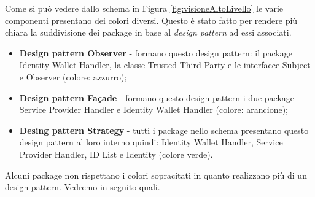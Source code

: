 Come si può vedere dallo schema in Figura \ref{fig:visioneAltoLivello} le varie componenti presentano dei colori diversi. Questo è stato fatto per rendere più chiara la suddivisione dei package in base al \textit{design pattern} ad essi associati.\\
\begin{itemize}
	\item \textbf{Design pattern Observer} - formano questo design pattern: il package Identity Wallet Handler, la classe Trusted Third Party e le interfacce Subject e Observer (colore: azzurro);
	\item \textbf{Design pattern Façade} - formano questo design pattern i due package Service Provider Handler e Identity Wallet Handler (colore: arancione);
	\item \textbf{Desing pattern Strategy} - tutti i package nello schema presentano questo design pattern al loro interno quindi: Identity Wallet Handler, Service Provider Handler, ID List e Identity (colore verde).
\end{itemize}
Alcuni package non rispettano i colori sopracitati in quanto realizzano più di un design pattern. Vedremo in seguito quali.
